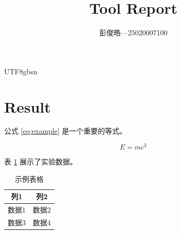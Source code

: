 \documentclass{article}
\begin{document}
\begin{CJK}{UTF8}{gbsn}

\title{Tool Report}
\author{彭俊皓—25020007100}
\maketitle

\section{Result}

公式 \eqref{eq:example} 是一个重要的等式。

\begin{equation}
E = mc^2
\label{eq:example}
\end{equation}

表 \ref{tab:data} 展示了实验数据。

\begin{table}[htbp]
\centering
\caption{示例表格}
\label{tab:data}
\begin{tabular}{|c|c|}
\hline
列1 & 列2 \\
\hline
数据1 & 数据2 \\
数据3 & 数据4 \\
\hline
\end{tabular}
\end{table}

\end{CJK}
\end{document}
